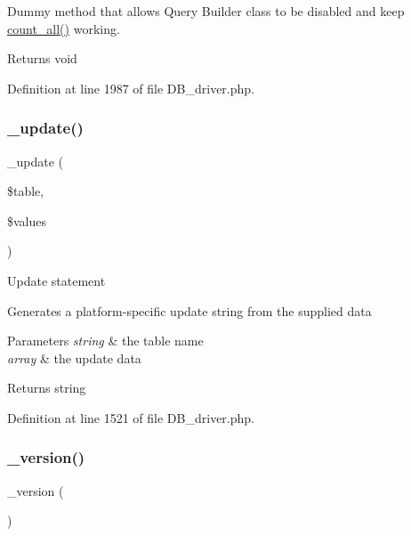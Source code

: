 Dummy method that allows Query Builder class to be disabled and keep \mbox{\hyperlink{class_c_i___d_b__driver_a7f59c2dc2e3226fe49f35f8c49e8fc94}{count\+\_\+all()}} working.

\begin{DoxyReturn}{Returns}
void 
\end{DoxyReturn}


Definition at line 1987 of file D\+B\+\_\+driver.\+php.

\mbox{\label{class_c_i___d_b__driver_a2540b03a93fa73ae74c10d0e16fc073e}} 
\subsubsection{\texorpdfstring{\_update()}{\_update()}}
{\footnotesize\ttfamily \+\_\+update (\begin{DoxyParamCaption}\item[{}]{\$table,  }\item[{}]{\$values }\end{DoxyParamCaption})\hspace{0.3cm}{\ttfamily [protected]}}

Update statement

Generates a platform-\/specific update string from the supplied data


\begin{DoxyParams}{Parameters}
{\em string} & the table name \\
\hline
{\em array} & the update data \\
\hline
\end{DoxyParams}
\begin{DoxyReturn}{Returns}
string 
\end{DoxyReturn}


Definition at line 1521 of file D\+B\+\_\+driver.\+php.

\mbox{\label{class_c_i___d_b__driver_ac997a462bb342f97f414910f0e033fb6}} 
\subsubsection{\texorpdfstring{\_version()}{\_version()}}
{\footnotesize\ttfamily \+\_\+version (\begin{DoxyParamCaption}{ }\end{DoxyParamCaption})\hspace{0.3cm}{\ttfamily [protected]}}

